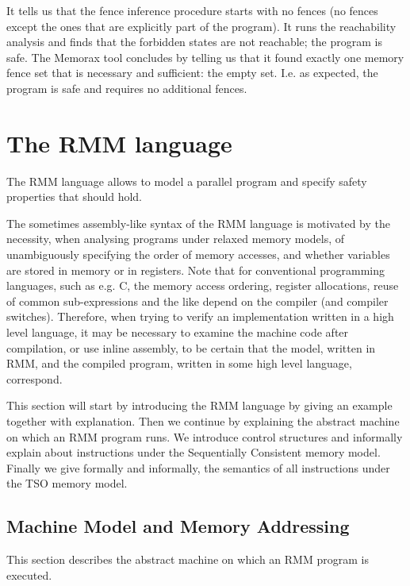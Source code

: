 \documentclass[a4paper]{article}
\newcommand{\Thetool}{The Memorax tool} %
\begin{document}
It tells us that the fence inference procedure starts with no fences
(no fences except the ones that are explicitly part of the
program). It runs the reachability analysis and finds that the
forbidden states are not reachable; the program is safe. \Thetool
concludes by telling us that it found exactly one memory fence set
that is necessary and sufficient: the empty set. I.e. as expected, the
program is safe and requires no additional fences.

\section{The RMM language}\label{sec:rmm:language}

The RMM language allows to model a parallel program and specify safety
properties that should hold.

The sometimes assembly-like syntax of the RMM language is motivated by
the necessity, when analysing programs under relaxed memory models, of
unambiguously specifying the order of memory accesses, and whether
variables are stored in memory or in registers. Note that for
conventional programming languages, such as e.g. C, the memory access
ordering, register allocations, reuse of common sub-expressions and the
like depend on the compiler (and compiler switches). Therefore, when
trying to verify an implementation written in a high level language,
it may be necessary to examine the machine code after compilation, or
use inline assembly, to be certain that the model, written in RMM, and
the compiled program, written in some high level language, correspond.

This section will start by introducing the RMM language by giving an
example together with explanation. Then we continue by explaining the
abstract machine on which an RMM program runs. We introduce control
structures and informally explain about instructions under the
Sequentially Consistent memory model. Finally we give formally and
informally, the semantics of all instructions under the TSO memory
model.

\subsection{Machine Model and Memory Addressing}\label{sec:abstmachinememaddr}

This section describes the abstract machine on which an RMM program is
executed. 
\end{document}

